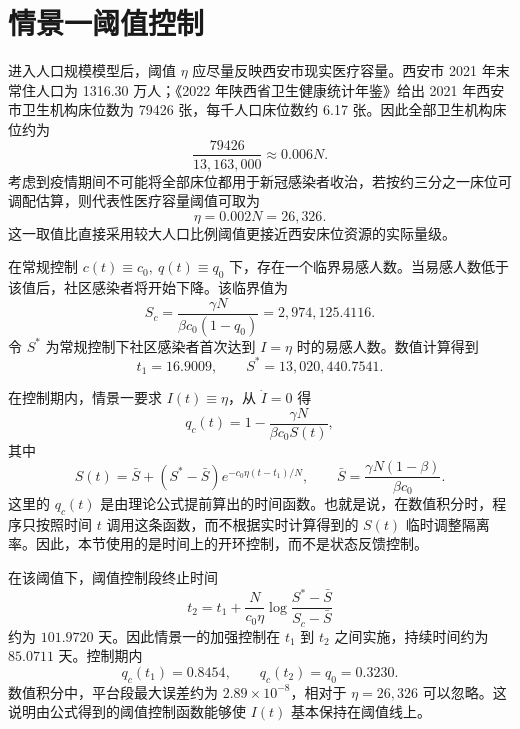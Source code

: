 \documentclass[UTF8,12pt,a4paper]{ctexart}
\numberwithin{equation}{section}
\begin{document}
\begin{table}[H]
    \centering
    \caption{$I_0=1$ 对照设定下的初值敏感性说明。}
    \label{tab:xian_i0_sensitivity}
    \resizebox{\textwidth}{!}{}
\end{table}

\section{情景一阈值控制}

进入人口规模模型后，阈值 $\eta$ 应尽量反映西安市现实医疗容量。西安市 2021 年末常住人口为 1316.30 万人\cite{XianStat2021}；《2022 年陕西省卫生健康统计年鉴》给出 2021 年西安市卫生机构床位数为 79426 张，每千人口床位数约 6.17 张\cite{ShaanxiHealth2022}。因此全部卫生机构床位约为
\[
\frac{79426}{13{,}163{,}000}\approx 0.006N.
\]
考虑到疫情期间不可能将全部床位都用于新冠感染者收治，若按约三分之一床位可调配估算，则代表性医疗容量阈值可取为
\begin{equation}
\eta=0.002N=26{,}326.
\end{equation}
这一取值比直接采用较大人口比例阈值更接近西安床位资源的实际量级。

在常规控制 $c(t)\equiv c_0,\ q(t)\equiv q_0$ 下，存在一个临界易感人数。当易感人数低于该值后，社区感染者将开始下降。该临界值为
\begin{equation}
S_c=\frac{\gamma N}{\beta c_0(1-q_0)}
=2{,}974{,}125.4116.
\end{equation}
令 $S^*$ 为常规控制下社区感染者首次达到 $I=\eta$ 时的易感人数。数值计算得到
\begin{equation}
t_1=16.9009,\qquad S^*=13{,}020{,}440.7541.
\end{equation}

在控制期内，情景一要求 $I(t)\equiv \eta$，从 $\dot I=0$ 得
\begin{equation}
q_c(t)=1-\frac{\gamma N}{\beta c_0 S(t)},
\end{equation}
其中
\begin{equation}
S(t)
=
\bar S+(S^*-\bar S)e^{-c_0\eta(t-t_1)/N},\qquad
\bar S=\frac{\gamma N(1-\beta)}{\beta c_0}.
\end{equation}
这里的 $q_c(t)$ 是由理论公式提前算出的时间函数。也就是说，在数值积分时，程序只按照时间 $t$ 调用这条函数，而不根据实时计算得到的 $S(t)$ 临时调整隔离率。因此，本节使用的是时间上的开环控制，而不是状态反馈控制。

在该阈值下，阈值控制段终止时间
\begin{equation}
t_2=t_1+\frac{N}{c_0\eta}
\log\frac{S^*-\bar S}{S_c-\bar S}
\end{equation}
约为 $101.9720$ 天。因此情景一的加强控制在 $t_1$ 到 $t_2$ 之间实施，持续时间约为 $85.0711$ 天。控制期内
\begin{equation}
q_c(t_1)=0.8454,\qquad q_c(t_2)=q_0=0.3230.
\end{equation}
数值积分中，平台段最大误差约为 $2.89\times 10^{-8}$，相对于 $\eta=26{,}326$ 可以忽略。这说明由公式得到的阈值控制函数能够使 $I(t)$ 基本保持在阈值线上。
\end{document}
